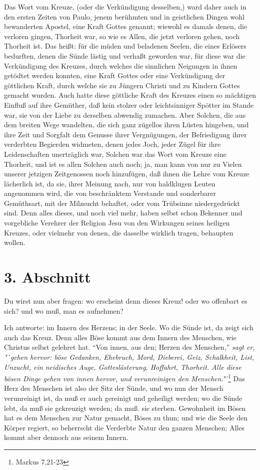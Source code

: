 Das Wort vom Kreuze, (oder die Verkündigung desselben,) ward daher auch in den
ersten Zeiten von Paulo, jenem berühmten und in geistlichen Dingen wohl
bewanderten Apostel, eine Kraft Gottes genannt; wiewohl es damals denen, die
verloren gingen, Thorheit war, so wie es Allen, die jetzt verloren gehen, noch
Thorheit ist. Das heißt: für die müden und beladenen Seelen, die eines Erlösers
bedurften, denen die Sünde lästig und verhaßt geworden war, für diese war die
Verkündigung des Kreuzes, durch welches die sinnlichen Neigungen in ihnen
getödtet werden konnten, eine Kraft Gottes oder eine Verkündigung der göttlichen
Kraft, durch welche sie zu Jüngern Christi und zu Kindern Gottes gemacht wurden.
Auch hatte diese göttliche Kraft des Kreuzes einen so mächtigen Einfluß auf ihre
Gemüther, daß kein stolzer oder leichtsinniger Spötter im Stande war, sie von
der Liebe zu derselben abwendig zumachen. Aber Solchen, die aus dem breiten Wege
wandelten, die sich ganz zügellos ihren Lüsten hingeben, und ihre Zeit und
Sorgfalt dem Genusse ihrer Vergnügungen, der Befriedigung ihrer verderbten
Begierden widmeten, denen jedes Joch, jeder Zügel für ihre Leidenschaften
unerträglich war, Solchen war das Wort vom Kreuze eine Thorheit, und ist es
allen Solchen auch noch; ja, man kann von nur zu Vielen unserer jetzigen
Zeitgenossen noch hinzufügen, daß ihnen die Lehre vom Kreuze lächerlich ist, da
sie, ihrer Meinung nach, nur von haldklugen Leuten angenommen wird, die von
beschränktem Verstande und sonderbarer Gemüthsart, mit der Milzsucht behaftet,
oder vom Trübsinne niedergedrückt sind. Denn alles dieses, und noch viel mehr,
haben selbst schon Bekenner und vorgebliche Verehrer der Religion Jesu von den
Wirkungen seines heiligen Kreuzes, oder vielmehr von denen, die dasselbe
wirklich tragen, behaupten wollen.

\section{3. Abschnitt} \label{kap3_ab3} 

Du wirst nun aber fragen: wo erscheint denn dieses Kreuz! oder wo offenbart es
sich? und wo muß, man es aufnehmen?

Ich antworte: im Innern des Herzens; in der Seele. Wo die Sünde ist, da zeigt
sich auch das Kreuz. Denn alles Böse kommt aus dem Innern des Menschen, wie
Christus selbst gelehret hat. "`Von innen, aus den; Herzen des Menschen,"' \textit{sagt
er, "`gehen hervor: böse Gedanken, Ehebruch, Mord, Dieberei, Geiz, Schalkheit,
List, Unzucht, ein neidisches Auge, Gotteslästerung, Hoffahrt, Thorheit. Alle
diese bösen Dinge gehen von innen hervor, und verunreinigen den
Menschen.}"'\footnote{Markus 7,21-23} Das Herz des Menschen ist also der Sitz der
Sünde, und wo nun der Mensch verunreinigt ist, da muß er auch gereinigt und
geheiligt werden; wo die Sünde lebt, da muß sie gekreuzigt werden; da muß. sie
sterben. Gewohnheit im Bösen hat es dem Menschen zur Natur gemacht, Böses zu
thun; und wie die Seele den Körper regiert, so beherrscht die Verderbte Natur
den ganzen Menschen; Alles kommt aber dennoch aus seinem Innern.


